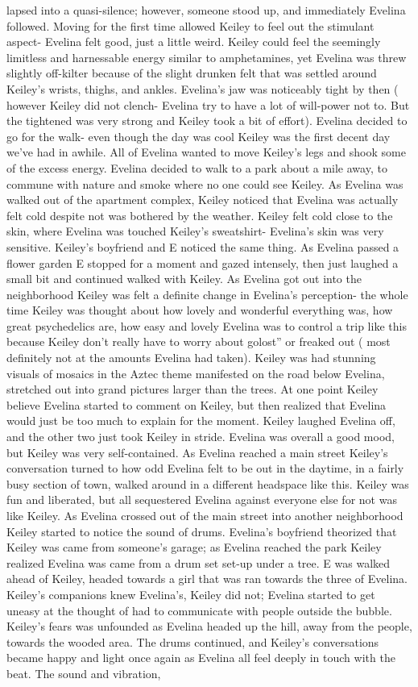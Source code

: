 \documentclass[12pt]{book}
\begin{document}
lapsed into a quasi-silence; however, someone stood up, and immediately Evelina followed. Moving for the first time allowed Keiley to feel out the stimulant aspect- Evelina felt good, just a little weird. Keiley could feel the seemingly limitless and harnessable energy similar to amphetamines, yet Evelina was threw slightly off-kilter because of the slight drunken felt that was settled around Keiley's wrists, thighs, and ankles. Evelina's jaw was noticeably tight by then ( however Keiley did not clench- Evelina try to have a lot of will-power not to. But the tightened was very strong and Keiley took a bit of effort). Evelina decided to go for the walk- even though the day was cool Keiley was the first decent day we've had in awhile. All of Evelina wanted to move Keiley's legs and shook some of the excess energy. Evelina decided to walk to a park about a mile away, to commune with nature and smoke where no one could see Keiley. As Evelina was walked out of the apartment complex, Keiley noticed that Evelina was actually felt cold despite not was bothered by the weather. Keiley felt cold close to the skin, where Evelina was touched Keiley's sweatshirt- Evelina's skin was very sensitive. Keiley's boyfriend and E noticed the same thing. As Evelina passed a flower garden E stopped for a moment and gazed intensely, then just laughed a small bit and continued walked with Keiley. As Evelina got out into the neighborhood Keiley was felt a definite change in Evelina's perception- the whole time Keiley was thought about how lovely and wonderful everything was, how great psychedelics are, how easy and lovely Evelina was to control a trip like this because Keiley don't really have to worry about golost'' or freaked out ( most definitely not at the amounts Evelina had taken). Keiley was had stunning visuals of mosaics in the Aztec theme manifested on the road below Evelina, stretched out into grand pictures larger than the trees. At one point Keiley believe Evelina started to comment on Keiley, but then realized that Evelina would just be too much to explain for the moment. Keiley laughed Evelina off, and the other two just took Keiley in stride. Evelina was overall a good mood, but Keiley was very self-contained. As Evelina reached a main street Keiley's conversation turned to how odd Evelina felt to be out in the daytime, in a fairly busy section of town, walked around in a different headspace like this. Keiley was fun and liberated, but all sequestered Evelina against everyone else for not was like Keiley. As Evelina crossed out of the main street into another neighborhood Keiley started to notice the sound of drums. Evelina's boyfriend theorized that Keiley was came from someone's garage; as Evelina reached the park Keiley realized Evelina was came from a drum set set-up under a tree. E was walked ahead of Keiley, headed towards a girl that was ran towards the three of Evelina. Keiley's companions knew Evelina's, Keiley did not; Evelina started to get uneasy at the thought of had to communicate with people outside the bubble. Keiley's fears was unfounded as Evelina headed up the hill, away from the people, towards the wooded area. The drums continued, and Keiley's conversations became happy and light once again as Evelina all feel deeply in touch with the beat. The sound and vibration, 
\end{document}
